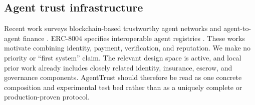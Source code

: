 \subsection{Agent trust infrastructure}
Recent work surveys blockchain-based trustworthy agent networks and agent-to-agent finance
\cite{agent-networks,a2a-finance}. ERC-8004 specifies interoperable agent registries
\cite{erc8004}. These works motivate combining identity, payment, verification, and reputation.
We make no priority or ``first system'' claim. The relevant design space is active, and local prior
work already includes closely related identity, insurance, escrow, and governance components.
AgentTrust should therefore be read as one concrete composition and experimental test bed rather than
as a uniquely complete or production-proven protocol.
